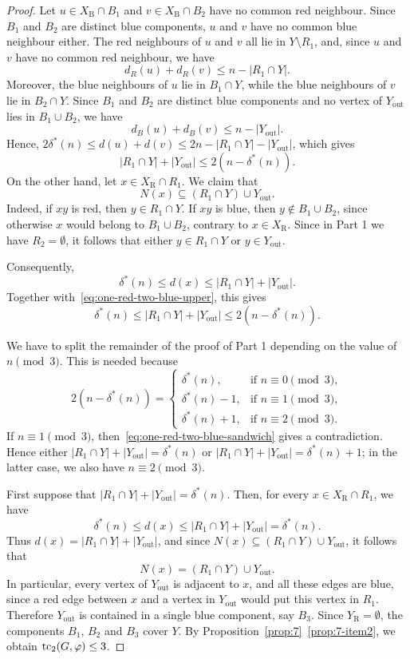 \documentclass[12pt,reqno,a4paper]{amsart}
\def\tc{\mathop{\text{\rm tc}}\nolimits}
\newcommand{\out}{\mathrm{out}}
\newcommand{\R}{\mathrm{R}}
\newcommand{\B}{\mathrm{B}}
\begin{document}
\begin{proof}
Let $u\in X_{\B}\cap B_1$ and $v\in X_{\B}\cap B_2$ have no common red
neighbour. Since $B_1$ and $B_2$ are distinct blue components, $u$ and $v$ have
no common blue neighbour either. The red neighbours of $u$ and $v$ all lie in
$Y\setminus R_1$, and, since $u$ and $v$ have no common red neighbour, we have
\[
    d_R(u)+d_R(v)\le n-|R_1\cap Y|.
\]
Moreover, the blue neighbours of $u$ lie in $B_1\cap Y$, while the blue
neighbours of $v$ lie in $B_2\cap Y$. Since $B_1$ and $B_2$ are distinct blue
components and no vertex of $Y_{\out}$ lies in $B_1\cup B_2$, we have
\[
    d_B(u)+d_B(v)\le n-|Y_{\out}|.
\]
Hence, $2\delta^*(n)\le d(u)+d(v)\le 2n-|R_1\cap Y|-|Y_{\out}|$,
which gives
\begin{equation}\label{eq:one-red-two-blue-upper}
    |R_1\cap Y|+|Y_{\out}|\le 2(n-\delta^*(n)).
\end{equation}
On the other hand, let $x\in X_{\R} \cap R_1$. We claim that
\[
    N(x)\subseteq (R_1\cap Y)\cup Y_{\out}.
\]
Indeed, if $xy$ is red, then $y\in R_1\cap Y$. If $xy$ is blue, then
$y\notin B_1\cup B_2$, since otherwise $x$ would belong to $B_1\cup B_2$,
contrary to $x\in X_{\R}$. Since in Part 1 we have $R_2=\emptyset$, it follows
that either $y\in R_1\cap Y$ or $y\in Y_{\out}$.

Consequently,
\[
    \delta^*(n)\le d(x)\le |R_1\cap Y|+|Y_{\out}|.
\]
Together with~\eqref{eq:one-red-two-blue-upper}, this gives
\begin{equation}\label{eq:one-red-two-blue-sandwich}
    \delta^*(n)\le |R_1\cap Y|+|Y_{\out}|\le 2(n-\delta^*(n)).
\end{equation}

We have to split the remainder of the proof of Part 1 depending on the value of
$n \pmod 3$. This is needed because 
\[
2(n-\delta^*(n))=
\begin{cases}
\delta^*(n), & \text{if } n\equiv 0 \pmod 3,\\
\delta^*(n)-1, & \text{if } n\equiv 1 \pmod 3,\\
\delta^*(n)+1, & \text{if } n\equiv 2 \pmod 3.
\end{cases}
\]
If $n\equiv 1\pmod 3$, then~\eqref{eq:one-red-two-blue-sandwich} gives a
contradiction. Hence either $|R_1\cap Y|+|Y_{\out}|=\delta^*(n)$ or
$|R_1\cap Y|+|Y_{\out}|=\delta^*(n)+1$; in the latter case, we also have $n\equiv 2\pmod
3$.

First suppose that $|R_1\cap Y|+|Y_{\out}|=\delta^*(n)$. Then, for every
$x\in X_{\R} \cap R_1$, we have
\[
    \delta^*(n)\le d(x)\le |R_1\cap Y|+|Y_{\out}|=\delta^*(n).
\]
Thus $d(x)=|R_1\cap Y|+|Y_{\out}|$, and since
$N(x)\subseteq (R_1\cap Y)\cup Y_{\out}$, it follows that
\[
    N(x)=(R_1\cap Y)\cup Y_{\out}.
\]
In particular, every vertex of $Y_{\out}$ is adjacent to $x$, and all these
edges are blue, since a red edge between $x$ and a vertex in $Y_{\out}$ would
put this vertex in $R_1$. Therefore $Y_{\out}$ is contained in a single blue
component, say $B_3$. Since $Y_{\R}=\emptyset$, the components $B_1$, $B_2$ and
$B_3$ cover $Y$. By Proposition~\ref{prop:7}~\ref{prop:7-item2}, we obtain
$\tc_2(G,\varphi)\le 3$.


\end{proof}
\end{document}
